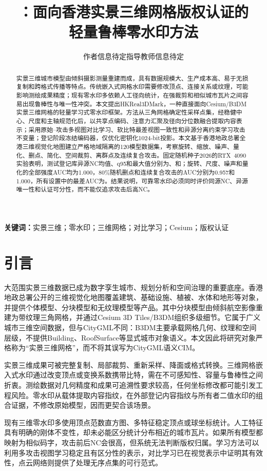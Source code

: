 \documentclass[UTF8,fontset=fandol,11pt]{ctexart}
\title{\method：面向香港实景三维网格版权认证的\\轻量鲁棒零水印方法}
\author{作者信息待定\quad 指导教师信息待定}
\date{}
\newcommand{\method}{HKReal3DMark}
\begin{document}
\maketitle
\begin{abstract}
实景三维城市模型由倾斜摄影测量重建而成，具有数据规模大、生产成本高、易于无损复制和跨格式传播等特点。传统嵌入式网格水印需要修改顶点、连接关系或纹理，可能影响测绘成果精度；现有零水印多依赖人工径向统计，在强裁剪和相似城市瓦片之间容易出现鲁棒性与唯一性冲突。本文提出\method，一种直接面向Cesium/B3DM实景三维网格的轻量学习式零水印框架。方法从三角网格确定性采样点集，经稳健中心、尺度和主轴规范化后，以共享点编码、注意力汇聚及径向分位数融合提取内容表示；采用原始--攻击多视图对比学习、软比特最差视图一致性和异源分离约束学习攻击不变量；登记阶段冻结编码器，仅优化密钥化1024-bit投影。本文基于香港地政总署全港三维视觉化地图建立严格地域隔离的120模型数据集，考察旋转、缩放、噪声、量化、删点、简化、空间裁剪、离群点及连续复合攻击。固定随机种子2026的RTX~4090实验表明，测试登记库异源NC均值、q95和最大值分别为\UniqueMean、\UniqueQ 和\UniqueMax；旋转、尺度、噪声和量化的全部强度AUC均为1.000，80\%随机删点和连续复合攻击的AUC分别为0.957和1.000，所有设置中的最差AUC为\WorstAUC。结果说明，可靠零水印必须同时评价同源NC、异源唯一性和认证可分性，而不能仅追求攻击后高NC。
\end{abstract}
\noindent\textbf{关键词：}实景三维；零水印；三维网格；对比学习；Cesium；版权认证

\section{引言}
大范围实景三维数据已成为数字孪生城市、规划分析和空间治理的重要底座。香港地政总署公开的三维视觉化地图覆盖建筑、基础设施、植被、水体和地形等对象，并提供个体模型、分块模型和无纹理模型等产品\cite{Open3Dhk}。其中分块模型由倾斜航空影像重建为带纹理三角网格，并通过Cesium 3D Tiles/B3DM组织多级细节。它属于广义城市三维空间数据，但与CityGML不同：B3DM主要承载网格几何、纹理和空间层级，不提供Building、RoofSurface等显式城市对象语义。本文因此将研究对象严格称为“实景三维网格”，而不将其误写为CityGML语义CIM。

实景三维成果可被完整复制、局部裁剪、重新采样、降面或格式转换。三维网格嵌入式水印通过改变顶点或变换系数携带比特，需在不可感知性、容量与鲁棒性之间折衷\cite{WangSurvey2008,WangDeepMesh2022,ZhuDeep3DMark2024}。测绘数据对几何精度和成果可追溯性要求较高，任何坐标修改都可能引发工程风险。零水印从载体提取内容指纹，在外部登记内容指纹与所有者二值水印的组合证据，不修改原始模型，因而更契合该场景。

现有三维零水印多使用顶点范数直方图、多特征稳定顶点或球坐标统计\cite{Jiang2018,Wang2019,Lee2021}。人工特征具有明确的刚体不变性，却未必能区分统计分布相近的城市瓦片。如果所有模型都映射为相似码字，攻击前后NC会很高，但系统无法判断版权归属。学习方法可以利用多攻击视图学习稳定且有区分性的表示，对比学习已在视觉表示中证明其有效性\cite{Chen2020}，点云网络则提供了处理无序点集的可行范式\cite{PointNet}。
\end{document}

